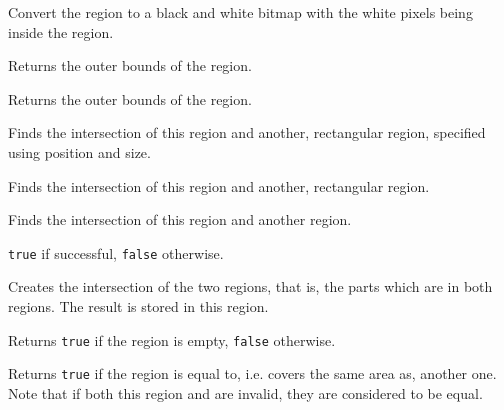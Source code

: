 Convert the region to a black and white bitmap with the white pixels
being inside the region.


\label{wxregiongetbox}


Returns the outer bounds of the region.


Returns the outer bounds of the region.


\label{wxregionintersect}


Finds the intersection of this region and another, rectangular region, specified using position and size.


Finds the intersection of this region and another, rectangular region.


Finds the intersection of this region and another region.


{\tt true} if successful, {\tt false} otherwise.


Creates the intersection of the two regions, that is, the parts which are in both regions. The result
is stored in this region.


\label{wxregionisempty}


Returns {\tt true} if the region is empty, {\tt false} otherwise.


\label{wxregionisequal}


Returns {\tt true} if the region is equal to, i.e. covers the same area as,
another one. Note that if both this region and  are invalid, they
are considered to be equal.


\label{wxregionsubtract}

